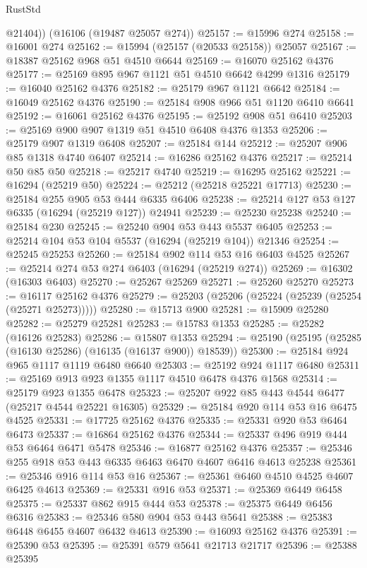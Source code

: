 \begin{lexlean}{RustStd}
\begin{coremodule}
        @21404))
    (@16106 (@19487 @25057 @274))
@25157 := @15996 @274
@25158 := @16001 @274
@25162 := @15994 (@25157 (@20533 @25158)) @25057
@25167 := @18387 @25162 @968 @51 @4510 @6644
@25169 := @16070 @25162 @4376
@25177 := @25169 @895 @967 @1121 @51 @4510 @6642 @4299 @1316
@25179 := @16040 @25162 @4376
@25182 := @25179 @967 @1121 @6642
@25184 := @16049 @25162 @4376
@25190 := @25184 @908 @966 @51 @1120 @6410 @6641
@25192 := @16061 @25162 @4376
@25195 := @25192 @908 @51 @6410
@25203 := @25169 @900 @907 @1319 @51 @4510 @6408 @4376 @1353
@25206 := @25179 @907 @1319 @6408
@25207 := @25184 @144
@25212 := @25207 @906 @85 @1318 @4740 @6407
@25214 := @16286 @25162 @4376
@25217 := @25214 @50 @85 @50
@25218 := @25217 @4740
@25219 := @16295 @25162
@25221 := @16294 (@25219 @50)
@25224 := @25212 (@25218 @25221 @17713)
@25230 := @25184 @255 @905 @53 @444 @6335 @6406
@25238 := @25214 @127 @53 @127 @6335 (@16294 (@25219 @127)) @24941
@25239 := @25230 @25238
@25240 := @25184 @230
@25245 := @25240 @904 @53 @443 @5537 @6405
@25253 := @25214 @104 @53 @104 @5537 (@16294 (@25219 @104)) @21346
@25254 := @25245 @25253
@25260 := @25184 @902 @114 @53 @16 @6403 @4525
@25267 := @25214 @274 @53 @274 @6403 (@16294 (@25219 @274))
@25269 := @16302 (@16303 @6403)
@25270 := @25267 @25269
@25271 := @25260 @25270
@25273 := @16117 @25162 @4376
@25279 := @25203 (@25206 (@25224 (@25239 (@25254 (@25271 @25273)))))
@25280 := @15713 @900
@25281 := @15909 @25280
@25282 := @25279 @25281
@25283 := @15783 @1353
@25285 := @25282 (@16126 @25283)
@25286 := @15807 @1353
@25294 := @25190 (@25195 (@25285 (@16130 @25286) (@16135 (@16137 @900)) @18539))
@25300 := @25184 @924 @965 @1117 @1119 @6480 @6640
@25303 := @25192 @924 @1117 @6480
@25311 := @25169 @913 @923 @1355 @1117 @4510 @6478 @4376 @1568
@25314 := @25179 @923 @1355 @6478
@25323 := @25207 @922 @85 @443 @4544 @6477 (@25217 @4544 @25221 @16305)
@25329 := @25184 @920 @114 @53 @16 @6475 @4525
@25331 := @17725 @25162 @4376
@25335 := @25331 @920 @53 @6464 @6473
@25337 := @16864 @25162 @4376
@25344 := @25337 @496 @919 @444 @53 @6464 @6471 @5478
@25346 := @16877 @25162 @4376
@25357 := @25346 @255 @918 @53 @443 @6335 @6463 @6470 @4607 @6416 @4613 @25238
@25361 := @25346 @916 @114 @53 @16
@25367 := @25361 @6460 @4510 @4525 @4607 @6425 @4613
@25369 := @25331 @916 @53
@25371 := @25369 @6449 @6458
@25375 := @25337 @862 @915 @444 @53
@25378 := @25375 @6449 @6456 @6316
@25383 := @25346 @580 @904 @53 @443 @5641
@25388 := @25383 @6448 @6455 @4607 @6432 @4613
@25390 := @16093 @25162 @4376
@25391 := @25390 @53
@25395 := @25391 @579 @5641 @21713 @21717
@25396 := @25388 @25395

\end{coremodule}
\end{lexlean}
